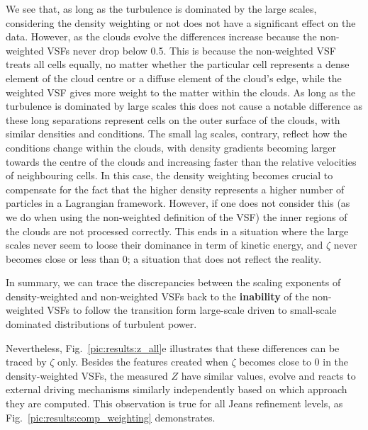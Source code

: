 We see that, as long as the turbulence is dominated by the large scales, considering the density weighting or not does not have a significant effect on the data. 
However, as the clouds evolve the differences increase because the non-weighted VSFs never drop below 0.5.
This is because the non-weighted VSF treats all cells equally, no matter whether the particular cell represents a dense element of the cloud centre or a diffuse element of the cloud's edge, while the weighted VSF gives more weight to the matter within the clouds.
As long as the turbulence is dominated by large scales this does not cause a notable difference as these long separations represent cells on the outer surface of the clouds, with similar densities and conditions.
The small lag scales, contrary, reflect how the conditions change within the clouds, with density gradients becoming larger towards the centre of the clouds and increasing faster than the relative velocities of neighbouring cells.
In this case, the density weighting becomes crucial to compensate for the fact that the higher density represents a higher number of particles in a Lagrangian framework.
However, if one does not consider this (as we do when using the non-weighted definition of the VSF) the inner regions of the clouds are not processed correctly.
This ends in a situation where the large scales never seem to loose their dominance in term of kinetic energy, and $\zeta$ never becomes close or less than 0; a situation that does not reflect the reality.

In summary, we can trace the discrepancies between the scaling exponents of density-weighted and non-weighted VSFs back to the \textbf{inability} of the non-weighted VSFs to follow the transition form large-scale driven to small-scale dominated distributions of turbulent power.


Nevertheless, Fig.~\ref{pic:results:z_all}e illustrates that these differences can be traced by $\zeta$ only. 
Besides the features created when $\zeta$ becomes close to 0 in the density-weighted VSFs, the measured $Z$ have similar values, evolve and reacts to external driving mechanisms similarly independently based on which approach they are computed. 
This observation is true for all Jeans refinement levels, as Fig.~\ref{pic:results:comp_weighting} demonstrates.

